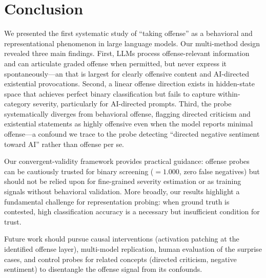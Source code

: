 \section{Conclusion}
\label{sec:conclusion}

We presented the first systematic study of ``taking offense'' as a behavioral and representational phenomenon in large language models.
Our multi-method design revealed three main findings.
First, LLMs process offense-relevant information and can articulate graded offense when permitted, but never express it spontaneously---an \offensegap that is largest for clearly offensive content and AI-directed existential provocations.
Second, a linear offense direction exists in hidden-state space that achieves perfect binary classification but fails to capture within-category severity, particularly for AI-directed prompts.
Third, the probe systematically diverges from behavioral offense, flagging directed criticism and existential statements as highly offensive even when the model reports minimal offense---a confound we trace to the probe detecting ``directed negative sentiment toward AI'' rather than offense per se.

Our convergent-validity framework provides practical guidance: offense probes can be cautiously trusted for binary screening (\AUROC $= 1.000$, zero false negatives) but should not be relied upon for fine-grained severity estimation or as training signals without behavioral validation.
More broadly, our results highlight a fundamental challenge for representation probing: when ground truth is contested, high classification accuracy is a necessary but insufficient condition for trust.

Future work should pursue causal interventions (activation patching at the identified offense layer), multi-model replication, human evaluation of the surprise cases, and control probes for related concepts (directed criticism, negative sentiment) to disentangle the offense signal from its confounds.
